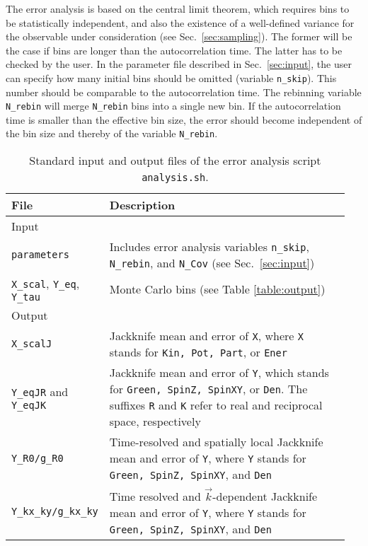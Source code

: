 %
The error analysis is based on the central limit theorem, which requires bins to be statistically independent, and also the existence of a well-defined variance for the observable under consideration (see Sec.~\ref{sec:sampling}).
The former will be the case if bins are  longer than the autocorrelation time.  The latter has to be checked by the user.  In the parameter file described in Sec.~\ref{sec:input}, the user  can specify how many initial bins should be omitted (variable \texttt{n\_skip}). 
This  number should be comparable to the autocorrelation time.     
The  rebinning  variable \texttt{N\_rebin} will merge \texttt{N\_rebin}  bins into a single new bin. 
If the autocorrelation time  is smaller than the effective bin size, the error should become independent of the bin size and thereby of the variable \texttt{N\_rebin}.
%
\begin{table}[h]
	\begin{center}
		\begin{tabular}{@{} p{0.2\linewidth} p{0.75\linewidth} @{}}\toprule
		File & Description  \\ \midrule
		Input &  \\\midrule %
		\texttt{parameters}  &  Includes error analysis variables \texttt{n\_skip}, \texttt{N\_rebin}, and \texttt{N\_Cov} (see Sec.~\ref{sec:input}) \\
		\texttt{X\_scal}, \texttt{Y\_eq}, \texttt{Y\_tau} & Monte Carlo bins (see Table \ref{table:output}) \vspace{5pt} \\

		Output &  \\\midrule
		\texttt{X\_scalJ} & Jackknife mean and error of \texttt{X}, where  \texttt{X} stands for \texttt{Kin, Pot, Part}, or \texttt{Ener}\\
		\texttt{Y\_eqJR} and \texttt{Y\_eqJK} & Jackknife mean and error of \texttt{Y}, which stands for \texttt{Green, SpinZ, SpinXY}, or \texttt{Den}. The suffixes \texttt{R} and \texttt{K} refer to real and reciprocal space, respectively\\
		\texttt{Y\_R0/g\_R0} & Time-resolved and spatially local Jackknife mean and error of \texttt{Y}, where \texttt{Y} stands for \texttt{Green, SpinZ, SpinXY}, and \texttt{Den}\\
		\texttt{Y\_kx\_ky/g\_kx\_ky} & Time resolved and $\vec{k}$-dependent Jackknife mean and error of \texttt{Y}, where \texttt{Y} stands for \texttt{Green, SpinZ, SpinXY}, and \texttt{Den}\\\bottomrule
	\end{tabular}
	\caption{ Standard input and output files of the error analysis script \texttt{analysis.sh}. \label{table:analysis_files}}
\end{center}
\end{table}
